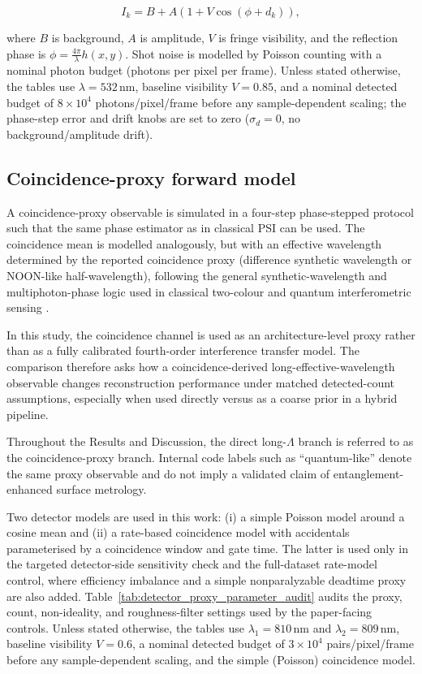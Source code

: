 \documentclass[photonics,article,submit,pdftex,moreauthors]{Definitions/mdpi}
\begin{document}
\begin{linenomath}
\begin{equation}
I_k = B + A\left(1 + V\cos(\phi + d_k)\right),
\end{equation}
\end{linenomath}
where $B$ is background, $A$ is amplitude, $V$ is fringe visibility, and the reflection phase is $\phi=\tfrac{4\pi}{\lambda}h(x,y)$. Shot noise is modelled by Poisson counting with a nominal photon budget (photons per pixel per frame).
Unless stated otherwise, the tables use $\lambda=532\,\mathrm{nm}$, baseline visibility $V=0.85$, and a nominal detected budget of $8\times 10^4$ photons/pixel/frame before any sample-dependent scaling; the phase-step error and drift knobs are set to zero ($\sigma_{d}=0$, no background/amplitude drift).

\subsection{Coincidence-proxy forward model}
A coincidence-proxy observable is simulated in a four-step phase-stepped protocol such that the same phase estimator as in classical PSI can be used. The coincidence mean is modelled analogously, but with an effective wavelength determined by the reported coincidence proxy (difference synthetic wavelength or NOON-like half-wavelength), following the general synthetic-wavelength and multiphoton-phase logic used in classical two-colour and quantum interferometric sensing \cite{Zhang2022,Kotsiuba2018207,Kapale2007,Jha2011,Sharma2022}.

In this study, the coincidence channel is used as an architecture-level proxy rather than as a fully calibrated fourth-order interference transfer model. The comparison therefore asks how a coincidence-derived long-effective-wavelength observable changes reconstruction performance under matched detected-count assumptions, especially when used directly versus as a coarse prior in a hybrid pipeline.

Throughout the Results and Discussion, the direct long-$\Lambda$ branch is referred to as the coincidence-proxy branch. Internal code labels such as ``quantum-like'' denote the same proxy observable and do not imply a validated claim of entanglement-enhanced surface metrology.

Two detector models are used in this work: (i) a simple Poisson model around a cosine mean and (ii) a rate-based coincidence model with accidentals parameterised by a coincidence window and gate time. The latter is used only in the targeted detector-side sensitivity check and the full-dataset rate-model control, where efficiency imbalance and a simple nonparalyzable deadtime proxy are also added. Table~\ref{tab:detector_proxy_parameter_audit} audits the proxy, count, non-ideality, and roughness-filter settings used by the paper-facing controls.
Unless stated otherwise, the tables use $\lambda_1=810\,\mathrm{nm}$ and $\lambda_2=809\,\mathrm{nm}$, baseline visibility $V=0.6$, a nominal detected budget of $3\times 10^4$ pairs/pixel/frame before any sample-dependent scaling, and the simple (Poisson) coincidence model.
\end{document}
